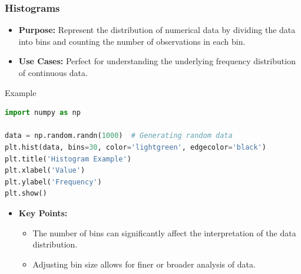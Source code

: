 \documentclass{beamer}
\begin{document}
\begin{frame}[fragile]
    \frametitle{Histograms}
    \begin{itemize}
        \item \textbf{Purpose:} Represent the distribution of numerical data by dividing the data into bins and counting the number of observations in each bin.
        \item \textbf{Use Cases:} Perfect for understanding the underlying frequency distribution of continuous data.
    \end{itemize}
    
    \begin{block}{Example}
        \begin{lstlisting}[language=Python]
import numpy as np

data = np.random.randn(1000)  # Generating random data
plt.hist(data, bins=30, color='lightgreen', edgecolor='black')
plt.title('Histogram Example')
plt.xlabel('Value')
plt.ylabel('Frequency')
plt.show()
        \end{lstlisting}
    \end{block}
    
    \begin{itemize}
        \item \textbf{Key Points:}
        \begin{itemize}
            \item The number of bins can significantly affect the interpretation of the data distribution.
            \item Adjusting bin size allows for finer or broader analysis of data.
        \end{itemize}
    \end{itemize}
\end{frame}
\end{document}
